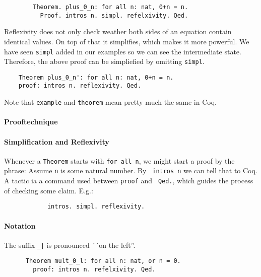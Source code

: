    \begin{example}
	   \begin{theorem}
  	   \begin{lstlisting}
   		Theorem. plus_0_n: for all n: nat, 0+n = n.
   		  Proof. intros n. simpl. refelxivity. Qed.
    	\end{lstlisting}	
	\end{theorem}
	\end{example}              
    \begin{remark}
    	Reflexivity does not only check weather both sides of an equation contain identical values. 
    	On top of that it simplifies, which makes it more powerful. 
    	We have seen \lstinline!simpl! added in our examples so we can see the intermediate state.
    	Therefore, the above proof can be simpliefied by omitting \lstinline!simpl!. 
     \end{remark}


	\begin{lstlisting}
    Theorem plus_0_n': for all n: nat, 0+n = n.
    proof: intros n. reflexivity. Qed.	
    \end{lstlisting}
    
    Note that \lstinline!example! and \lstinline!theorem! mean pretty much the same in Coq.
    
   
    \paragraph{Prooftechnique}
    \paragraph{Simplification and Reflexivity}
     Whenever a \lstinline!Theorem! starts with \lstinline!for all n!, we might start a proof by the phrase:
     Assume \lstinline!n! is some natural number. By \lstinline! intros n! we can tell that to Coq.\\
     A tactic ia a command used between \lstinline!proof! and \lstinline! Qed.!, which guides the process of checking some claim. E.g.:
	    \begin{lstlisting}
	    	intros. simpl. reflexivity.
    	\end{lstlisting}
     
     \paragraph{Notation} 
     The suffix \lstinline!_|! is pronounced ´´on the left''.  
      \begin{lstlisting}
      Theorem mult_0_l: for all n: nat, or n = 0.
        proof: intros n. refelxivity. Qed.
     \end{lstlisting}
      
